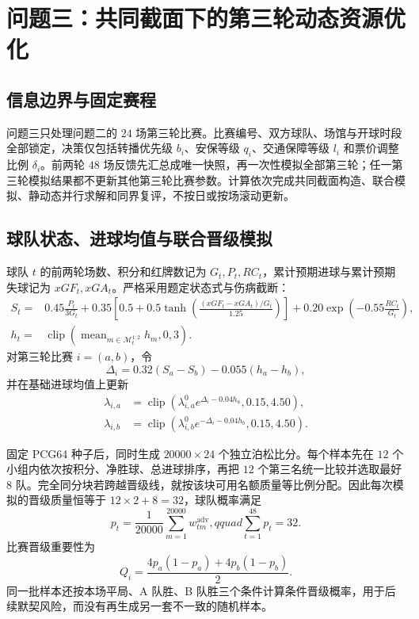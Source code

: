 \section{问题三：共同截面下的第三轮动态资源优化}

\subsection{信息边界与固定赛程}

问题三只处理问题二的 $24$ 场第三轮比赛。比赛编号、双方球队、场馆与开球时段全部锁定，决策仅包括转播优先级 $b_i$、安保等级 $q_i$、交通保障等级 $l_i$ 和票价调整比例 $\delta_i$。前两轮 $48$ 场反馈先汇总成唯一快照，再一次性模拟全部第三轮；任一第三轮模拟结果都不更新其他第三轮比赛参数。计算依次完成共同截面构造、联合模拟、静动态并行求解和同界复评，不按日或按场滚动更新。

\subsection{球队状态、进球均值与联合晋级模拟}

球队 $t$ 的前两轮场数、积分和红牌数记为 $G_t,P_t,RC_t$，累计预期进球与累计预期失球记为 $xGF_t,xGA_t$。严格采用题定状态式与伤病截断：
\begin{align}
S_t={}&0.45\frac{P_t}{3G_t}+0.35\left[0.5+0.5\tanh\!\left(\frac{(xGF_t-xGA_t)/G_t}{1.25}\right)\right]
+0.20\exp\!\left(-0.55\frac{RC_t}{G_t}\right),\\
h_t={}&\operatorname{clip}\!\left(\operatorname{mean}_{m\in\mathcal M_t^{1:2}}h_m,0,3\right).
\end{align}
对第三轮比赛 $i=(a,b)$，令
\begin{equation}
\Delta_i=0.32(S_a-S_b)-0.055(h_a-h_b),
\end{equation}
并在基础进球均值上更新
\begin{align}
\lambda_{i,a}&=\operatorname{clip}\!\left(\lambda^0_{i,a}e^{\Delta_i-0.04h_a},0.15,4.50\right),\\
\lambda_{i,b}&=\operatorname{clip}\!\left(\lambda^0_{i,b}e^{-\Delta_i-0.04h_b},0.15,4.50\right).
\end{align}

固定 PCG64 种子后，同时生成 $20000\times24$ 个独立泊松比分。每个样本先在 $12$ 个小组内依次按积分、净胜球、总进球排序，再把 $12$ 个第三名统一比较并选取最好 $8$ 队。完全同分块若跨越晋级线，就按该块可用名额质量等比例分配。因此每次模拟的晋级质量恒等于 $12\times2+8=32$，球队概率满足
\begin{equation}
p_t=\frac{1}{20000}\sum_{m=1}^{20000}w_{tm}^{\mathrm{adv}},qquad
\sum_{t=1}^{48}p_t=32.
\end{equation}
比赛晋级重要性为
\begin{equation}
Q_i=\frac{4p_a(1-p_a)+4p_b(1-p_b)}{2}.
\end{equation}
同一批样本还按本场平局、A 队胜、B 队胜三个条件计算条件晋级概率，用于后续默契风险，而没有再生成另一套不一致的随机样本。

